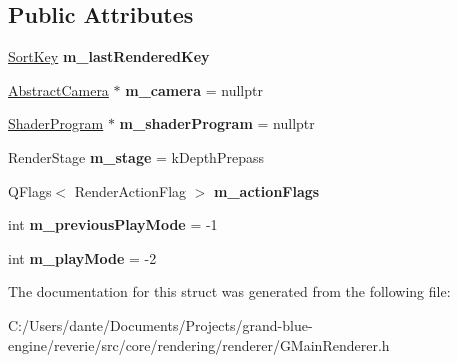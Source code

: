 \subsection*{Public Attributes}
\begin{DoxyCompactItemize}
\item 
\mbox{\label{structrev_1_1_render_frame_state_ab75a65fcc6b6c37dce59c39460a6be9c}} 
\mbox{\hyperlink{classrev_1_1_sort_key}{Sort\+Key}} {\bfseries m\+\_\+last\+Rendered\+Key}
\item 
\mbox{\label{structrev_1_1_render_frame_state_a185200023618a601664f4cebd25cc60a}} 
\mbox{\hyperlink{classrev_1_1_abstract_camera}{Abstract\+Camera}} $\ast$ {\bfseries m\+\_\+camera} = nullptr
\item 
\mbox{\label{structrev_1_1_render_frame_state_a90169f7fa86e9618e1dbc53a02244b36}} 
\mbox{\hyperlink{classrev_1_1_shader_program}{Shader\+Program}} $\ast$ {\bfseries m\+\_\+shader\+Program} = nullptr
\item 
\mbox{\label{structrev_1_1_render_frame_state_a855fa1d8acafaa53f24fbdf7a19ae287}} 
Render\+Stage {\bfseries m\+\_\+stage} = k\+Depth\+Prepass
\item 
\mbox{\label{structrev_1_1_render_frame_state_a9386aa0b10dc4be49629d70893dd9b06}} 
Q\+Flags$<$ Render\+Action\+Flag $>$ {\bfseries m\+\_\+action\+Flags}
\item 
\mbox{\label{structrev_1_1_render_frame_state_a4127209e8b1b79b08dbff5c79d23cbf4}} 
int {\bfseries m\+\_\+previous\+Play\+Mode} = -\/1
\item 
\mbox{\label{structrev_1_1_render_frame_state_a98056eaae89b4f585b7957450fc171ce}} 
int {\bfseries m\+\_\+play\+Mode} = -\/2
\end{DoxyCompactItemize}


The documentation for this struct was generated from the following file\+:\begin{DoxyCompactItemize}
\item 
C\+:/\+Users/dante/\+Documents/\+Projects/grand-\/blue-\/engine/reverie/src/core/rendering/renderer/G\+Main\+Renderer.\+h\end{DoxyCompactItemize}
